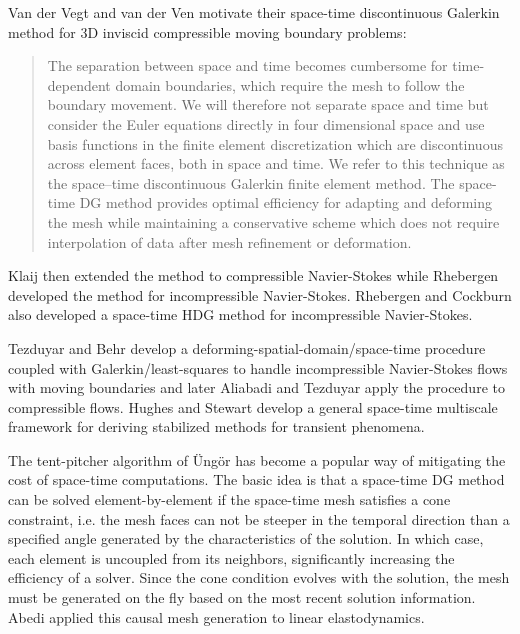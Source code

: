 \documentclass[Proposal.tex]{subfiles}
\begin{document}
Van der Vegt and van der Ven\cite{vanderVegtEuler} motivate their space-time discontinuous Galerkin method 
for 3D inviscid compressible moving boundary problems:
\begin{quotation}
The separation between space and time becomes cumbersome for time-dependent domain
boundaries, which require the mesh to follow the boundary movement. We will therefore
not separate space and time but consider the Euler equations directly in four dimensional
space and use basis functions in the finite element discretization which are discontinuous
across element faces, both in space and time.
We refer to this technique as the space–time discontinuous Galerkin finite element method.
The space-time DG method provides optimal efficiency for adapting and deforming the mesh while maintaining a conservative scheme which
does not require interpolation of data after mesh refinement or deformation.
\end{quotation}
Klaij \etal\cite{KlaijCompressible} then extended the method to compressible Navier-Stokes while Rhebergen \etal\cite{Rhebergen2013}
developed the method for incompressible Navier-Stokes.
Rhebergen and Cockburn\cite{RhebergenHDG} also developed a space-time HDG method for incompressible Navier-Stokes.

Tezduyar and Behr\cite{Tezduyar1992} develop a deforming-spatial-domain/space-time procedure coupled with Galerkin/least-squares 
to handle incompressible Navier-Stokes flows
with moving boundaries and later Aliabadi and Tezduyar\cite{Aliabadi1993} apply the procedure to compressible flows.
Hughes and Stewart\cite{HughesSpaceTime} develop a general space-time multiscale framework for deriving stabilized methods for
transient phenomena.

The tent-pitcher algorithm of {\"U}ng{\"o}r\cite{TentPitcher} has become a popular way of mitigating the cost of space-time computations.
The basic idea is that a space-time DG method can be solved element-by-element if the space-time mesh satisfies a cone constraint, i.e.
the mesh faces can not be steeper in the temporal direction than a specified angle generated by the characteristics of the solution.
In which case, each element is uncoupled from its neighbors, significantly increasing the efficiency of a solver. 
Since the cone condition evolves with the solution, the mesh must be generated on the fly based on the most recent solution information.
Abedi \etal\cite{Abedi2006} applied this causal mesh generation to linear elastodynamics.

\end{document}
